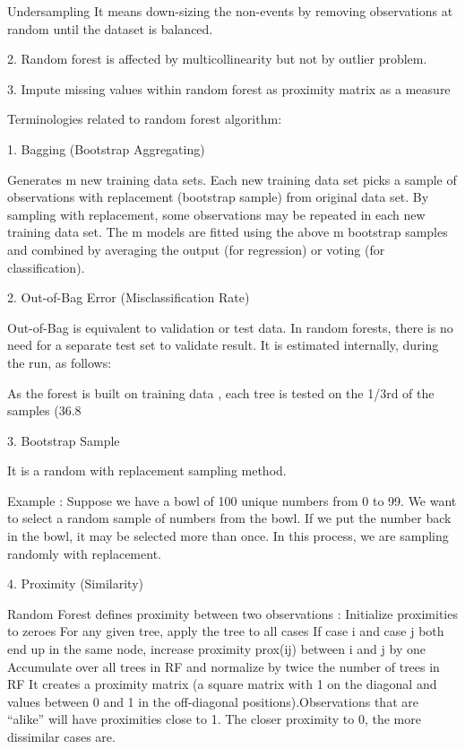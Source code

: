 Undersampling
It means down-sizing the non-events by removing observations at random until the dataset is balanced.

2. Random forest is affected by multicollinearity but not by outlier problem.

3. Impute missing values within random forest as proximity matrix as a measure

Terminologies related to random forest algorithm:

1. Bagging (Bootstrap Aggregating)

Generates m new training data sets.  Each new training data set picks a sample of observations with replacement (bootstrap sample) from original data set.  By sampling with replacement, some observations may be repeated in each new training data set. The m models are fitted using the above m bootstrap samples and combined by averaging the output (for regression) or voting (for classification).

2. Out-of-Bag Error (Misclassification Rate)

Out-of-Bag is equivalent to validation or test data. In random forests, there is no need for a separate test set to validate result. It is estimated internally, during the run, as follows:

As the forest is built on training data , each tree is tested on the 1/3rd of the samples (36.8%

3. Bootstrap Sample

It is a random with replacement sampling method.

Example : Suppose we have a bowl of 100 unique numbers from 0 to 99. We want to select a random sample of numbers from the bowl. If we put the number back in the bowl, it may be selected more than once. In this process, we are sampling randomly with replacement.

4. Proximity (Similarity)

Random Forest defines proximity between two observations :
Initialize proximities to zeroes
For any given tree, apply the tree to all cases
If case i and case j both end up in the same node, increase proximity prox(ij) between i and j by one 
Accumulate over all trees in RF and normalize by twice the number of trees in RF
It creates a proximity matrix (a square matrix with 1 on the diagonal and values between 0 and 1 in the off-diagonal positions).Observations that are “alike” will have proximities close to 1. The closer proximity to 0, the more dissimilar cases are.

